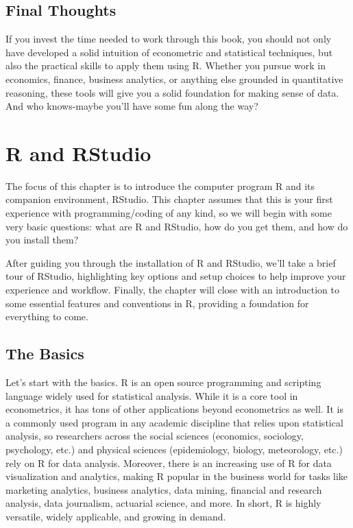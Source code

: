 \documentclass[
  letterpaper,
]{book}
\begin{document}
\section{Final Thoughts}\label{final-thoughts}

If you invest the time needed to work through this book, you should not
only have developed a solid intuition of econometric and statistical
techniques, but also the practical skills to apply them using R. Whether
you pursue work in economics, finance, business analytics, or anything
else grounded in quantitative reasoning, these tools will give you a
solid foundation for making sense of data. And who knows-maybe you'll
have some fun along the way?


\chapter{R and RStudio}\label{sec-basicR}

The focus of this chapter is to introduce the computer program R and its
companion environment, RStudio. This chapter assumes that this is your
first experience with programming/coding of any kind, so we will begin
with some very basic questions: what are R and RStudio, how do you get
them, and how do you install them?

After guiding you through the installation of R and RStudio, we'll take
a brief tour of RStudio, highlighting key options and setup choices to
help improve your experience and workflow. Finally, the chapter will
close with an introduction to some essential features and conventions in
R, providing a foundation for everything to come.

\section{The Basics}\label{the-basics}

Let's start with the basics. R is an open source programming and
scripting language widely used for statistical analysis. While it is a
core tool in econometrics, it has tons of other applications beyond
econometrics as well. It is a commonly used program in any academic
discipline that relies upon statistical analysis, so researchers across
the social sciences (economics, sociology, psychology, etc.) and
physical sciences (epidemiology, biology, meteorology, etc.) rely on R
for data analysis. Moreover, there is an increasing use of R for data
visualization and analytics, making R popular in the business world for
tasks like marketing analytics, business analytics, data mining,
financial and research analysis, data journalism, actuarial science, and
more. In short, R is highly versatile, widely applicable, and growing in
demand.
\end{document}
